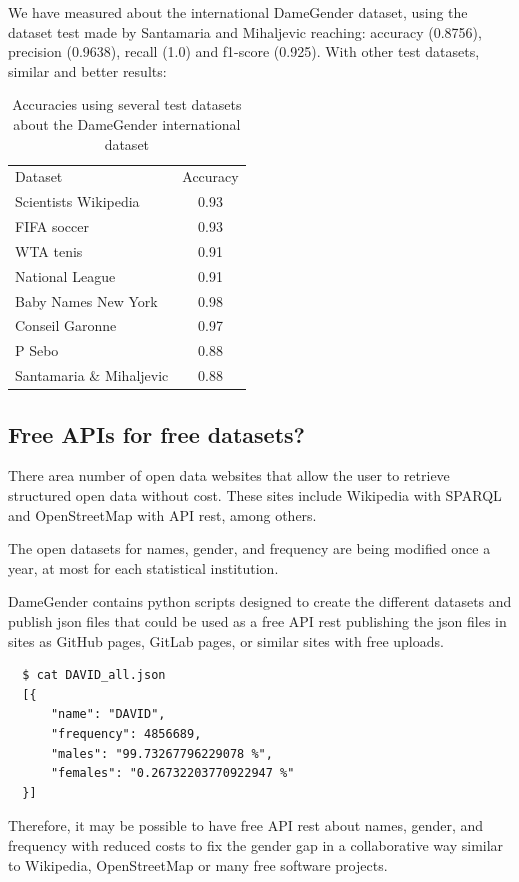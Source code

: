 \documentclass[a4paper]{article}
\begin{document}
We have measured about the international DameGender dataset,
using the dataset test made by Santamaria and Mihaljevic
\cite{10.7717/peerj-cs.156} reaching: accuracy (0.8756), precision
(0.9638), recall (1.0) and f1-score (0.925). With other test datasets,
similar and better results:

\begin{table}[t]
  \footnotesize
  \begin{tabular}[]{lc}
    \hline
    Dataset & Accuracy  \tabularnewline
    Scientists Wikipedia & 0.93 \tabularnewline
    FIFA soccer & 0.93 \tabularnewline
    WTA tenis & 0.91 \tabularnewline
    National League & 0.91 \tabularnewline
    Baby Names New York & 0.98 \tabularnewline    
    Conseil Garonne & 0.97 \tabularnewline
    P Sebo\cite{sebo2021performance} & 0.88 \tabularnewline
    Santamaria \& Mihaljevic\cite{10.7717/peerj-cs.156} & 0.88 \tabularnewline
  \end{tabular}
  \caption{Accuracies using several test datasets about the DameGender international dataset}
  \label{table:SeveralTests}
\end{table}

\subsection{Free APIs for free datasets?}
\label{sec:freeapis}

There area number of open data websites that allow the user to retrieve structured open data without cost. These sites include Wikipedia with SPARQL and OpenStreetMap with API rest, among others.

The open datasets for names, gender, and frequency are being modified once a year, at most for each statistical institution.

DameGender contains python scripts designed to create the
different datasets and publish json files that could be used as a free
API rest publishing the json files in sites as GitHub pages, GitLab
pages, or similar sites with free uploads.

\begin{verbatim}
  $ cat DAVID_all.json
  [{
      "name": "DAVID",
      "frequency": 4856689,
      "males": "99.73267796229078 %",
      "females": "0.26732203770922947 %"
  }]
\end{verbatim}

Therefore, it may be possible to have free API rest about names,
gender, and frequency with reduced costs to fix the gender gap
in a collaborative way similar to Wikipedia, OpenStreetMap or
many free software projects.
\end{document}
